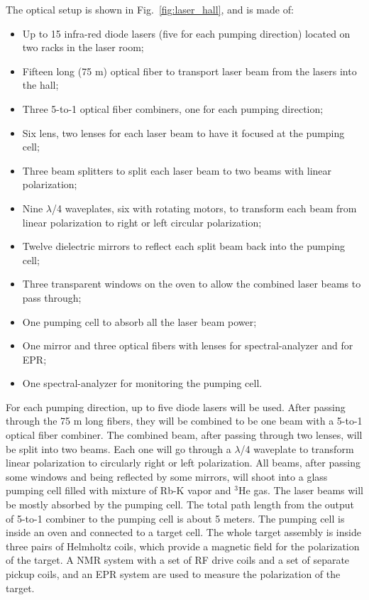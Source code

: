 {The optical setup is shown in Fig.~\ref{fig:laser_hall}, and is made of:
\begin {itemize}
\item Up to 15 infra-red diode lasers (five for each pumping direction) 
located on two racks in the laser room;
\item Fifteen long (75 m) optical fiber to transport laser beam from the lasers
into the hall;
\item Three 5-to-1 optical fiber combiners, one for each pumping direction;
\item Six lens, two lenses for each laser beam to have it focused at the 
pumping cell;
\item Three beam splitters to split each laser beam to two beams with linear polarization;
\item Nine $\lambda$/4 waveplates, six with rotating motors, to transform 
each beam from linear polarization to right or left circular polarization;
\item Twelve dielectric mirrors to reflect each split beam back into the pumping cell;
\item Three transparent windows 
on the oven to allow the combined laser beams to pass through;
\item One pumping cell to absorb all the laser beam power;
\item One mirror and three optical fibers with lenses for 
spectral-analyzer and for EPR;
\item One spectral-analyzer for monitoring the pumping cell.
\end {itemize}

For each pumping direction, up to five diode lasers will be used. 
After passing through the 75 m long fibers, they will be combined
to be one beam with a 5-to-1 optical fiber combiner. The combined beam, after passing through two lenses,
will be split into two beams. Each one will go through a $\lambda$/4 waveplate
to transform linear polarization to circularly right or left polarization. 
All beams, after passing some windows and being reflected by some mirrors,  
will shoot into a glass pumping cell filled with
mixture of Rb-K vapor and $^3$He gas. The laser beams will be mostly absorbed
by the pumping cell. The total path length from the output of 5-to-1 combiner 
to the pumping cell
is about 5 meters. The pumping cell is inside an oven and 
connected to a target cell. The whole target assembly is inside three pairs of
Helmholtz coils, which provide a magnetic field for the polarization of the
target. A NMR system with a set of RF drive coils and a set of separate 
pickup coils, and an EPR system 
are used to measure the polarization of the target.


}
